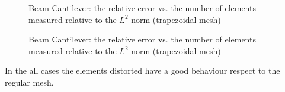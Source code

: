 \documentclass[preprint,12pt,authoryear]{elsarticle}
\begin{document}
\begin{figure}[h!]
\begin{center}
\caption{Beam Cantilever: the relative error vs. the number of elements measured relative to the $L^{2}$ norm (trapezoidal mesh)}
\end{center}
\end{figure}
%
\begin{figure}[h!]
\begin{center}
\caption{Beam Cantilever: the relative error vs. the number of elements measured relative to the $L^{2}$ norm (trapezoidal mesh)}
\end{center}
\end{figure}
In the all cases the elements distorted have a good behaviour respect to the regular mesh.  
\end{document}
